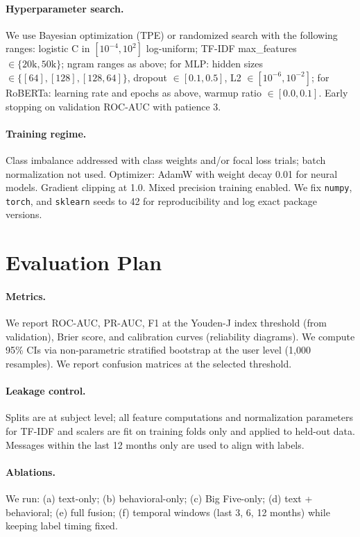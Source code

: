 \paragraph{Hyperparameter search.} We use Bayesian optimization (TPE) or randomized search with the following ranges: logistic C in \([10^{-4}, 10^{2}]\) log-uniform; TF-IDF max\_features \(\in\{20\text{k}, 50\text{k}\}\); ngram ranges as above; for MLP: hidden sizes \(\in\{[64], [128], [128,64]\}\), dropout \(\in[0.1,0.5]\), L2 \(\in[10^{-6}, 10^{-2}]\); for RoBERTa: learning rate and epochs as above, warmup ratio \(\in[0.0,0.1]\). Early stopping on validation ROC-AUC with patience 3.

\paragraph{Training regime.} Class imbalance addressed with class weights and/or focal loss trials; batch normalization not used. Optimizer: AdamW with weight decay 0.01 for neural models. Gradient clipping at 1.0. Mixed precision training enabled. We fix \verb|numpy|, \verb|torch|, and \verb|sklearn| seeds to 42 for reproducibility and log exact package versions.

\section{Evaluation Plan}
\label{sec:methods-eval}
\paragraph{Metrics.} We report ROC-AUC, PR-AUC, F1 at the Youden-J index threshold (from validation), Brier score, and calibration curves (reliability diagrams). We compute 95\% CIs via non-parametric stratified bootstrap at the user level (1,000 resamples). We report confusion matrices at the selected threshold.

\paragraph{Leakage control.} Splits are at subject level; all feature computations and normalization parameters for TF-IDF and scalers are fit on training folds only and applied to held-out data. Messages within the last 12 months only are used to align with labels.

\paragraph{Ablations.} We run: (a) text-only; (b) behavioral-only; (c) Big Five-only; (d) text + behavioral; (e) full fusion; (f) temporal windows (last 3, 6, 12 months) while keeping label timing fixed.

